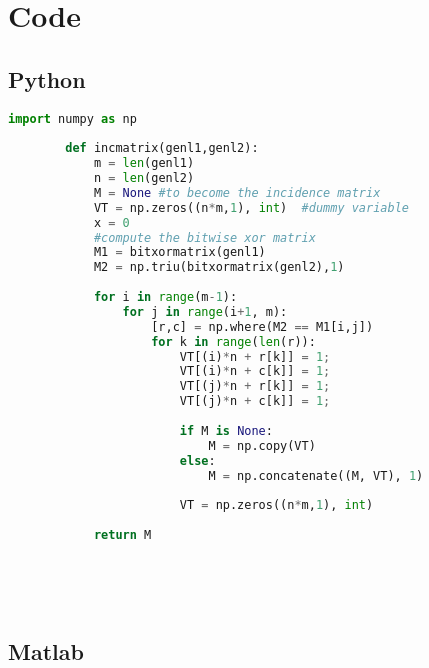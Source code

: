 \section{Code}

  \subsection{Python}

        \begin{lstlisting}[language=Python, caption={Python code to create an incidence matrix}]
        import numpy as np
            
        def incmatrix(genl1,genl2):
            m = len(genl1)
            n = len(genl2)
            M = None #to become the incidence matrix
            VT = np.zeros((n*m,1), int)  #dummy variable
            x = 0
            #compute the bitwise xor matrix
            M1 = bitxormatrix(genl1)
            M2 = np.triu(bitxormatrix(genl2),1) 
        
            for i in range(m-1):
                for j in range(i+1, m):
                    [r,c] = np.where(M2 == M1[i,j])
                    for k in range(len(r)):
                        VT[(i)*n + r[k]] = 1;
                        VT[(i)*n + c[k]] = 1;
                        VT[(j)*n + r[k]] = 1;
                        VT[(j)*n + c[k]] = 1;
                        
                        if M is None:
                            M = np.copy(VT)
                        else:
                            M = np.concatenate((M, VT), 1)
                        
                        VT = np.zeros((n*m,1), int)
            
            return M



    
        \end{lstlisting}
\newpage

\subsection{Matlab}


